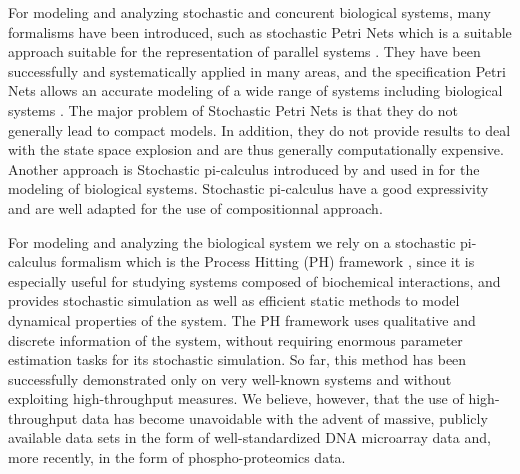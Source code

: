 


For modeling and analyzing stochastic and concurent biological systems, many formalisms have been introduced, such as 
stochastic Petri Nets which is a suitable approach suitable for the representation of parallel systems \cite{molloy1982performance}. 
They have been successfully and systematically applied in many areas, and the specification Petri Nets
allows an accurate modeling of a wide range of systems including biological systems \cite{heiner2008petri}. The major 
problem of Stochastic Petri Nets is that they do not generally lead to compact models. In addition,
they do not provide results to deal with the state space explosion and are thus generally computationally
expensive. Another approach is Stochastic pi-calculus introduced by \cite{priami1995stochastic} and used in 
\cite{maurin2009modeling} for the modeling of biological systems. Stochastic pi-calculus have a good
expressivity and are well adapted for the use of compositionnal approach.

For modeling and analyzing the biological system we rely on a stochastic pi-calculus formalism which is the Process Hitting (PH) framework \cite{PMR10-TCSB}, 
since it is especially useful for studying systems composed of biochemical interactions, and provides
stochastic simulation as well as efficient static methods to model dynamical properties of the system.
The PH framework uses qualitative and discrete information of the system, without requiring enormous parameter estimation tasks
 for its stochastic simulation. 
So far, this method has been successfully demonstrated only on very well-known systems and without exploiting 
high-throughput measures. We believe, however, that the use of high-throughput data has become unavoidable with 
the advent of massive, publicly available data sets in the form of well-standardized DNA microarray data and, 
more recently, in the form of phospho-proteomics data.  




